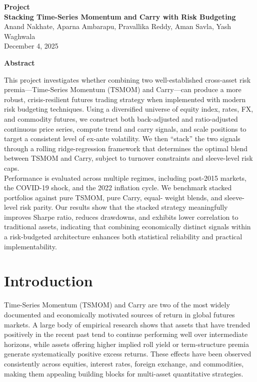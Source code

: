 \documentclass{article}
\begin{document}
\begin{center}
    {\LARGE \textbf{Project}} \\[0.25cm]
    {\Large \textbf{Stacking Time-Series Momentum and Carry with Risk Budgeting}} \\[0.5cm]

    {\large Anand Nakhate, Aparna Ambarapu, Pravallika Reddy, Aman Savla, Yash Waghwala} \\[0.25cm]

    December 4, 2025
\end{center}

\vspace{0.6cm}

\begin{center}
{\Large \textbf{Abstract}}
\end{center}

This project investigates whether combining two well-established cross-asset risk premia—Time-Series
Momentum (TSMOM) and Carry—can produce a more robust, crisis-resilient futures trading strategy
when implemented with modern risk budgeting techniques. Using a diversified universe of equity index,
rates, FX, and commodity futures, we construct both back-adjusted and ratio-adjusted continuous price
series, compute trend and carry signals, and scale positions to target a consistent level of ex-ante volatility.
We then “stack” the two signals through a rolling ridge-regression framework that determines the optimal
blend between TSMOM and Carry, subject to turnover constraints and sleeve-level risk caps.\\[0\baselineskip]

Performance is evaluated across multiple regimes, including post-2015 markets, the COVID-19 shock,
and the 2022 inflation cycle. We benchmark stacked portfolios against pure TSMOM, pure Carry, equal-
weight blends, and sleeve-level risk parity. Our results show that the stacked strategy meaningfully
improves Sharpe ratio, reduces drawdowns, and exhibits lower correlation to traditional assets, indicating
that combining economically distinct signals within a risk-budgeted architecture enhances both statistical
reliability and practical implementability.

\section{Introduction}

Time-Series Momentum (TSMOM) and Carry are two of the most widely documented and economically
motivated sources of return in global futures markets. A large body of empirical research shows that
assets that have trended positively in the recent past tend to continue performing well over intermediate
horizons, while assets offering higher implied roll yield or term-structure premia generate systematically
positive excess returns. These effects have been observed consistently across equities, interest rates,
foreign exchange, and commodities, making them appealing building blocks for multi-asset quantitative
strategies.\\[0\baselineskip]
\end{document}
